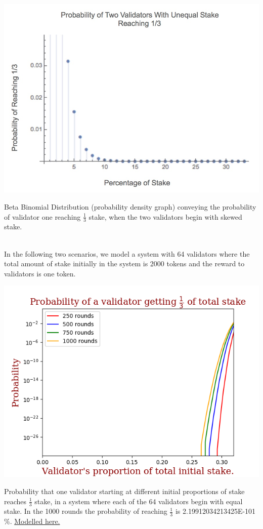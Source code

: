 \documentclass{article}
\renewcommand{\|}{\;|\;}
\begin{document}
\begin{center}
\includegraphics[scale=0.3]{images/2SkuVal.jpg}\newline\caption{Beta Binomial Distribution (probability density graph) conveying the probability of validator one reaching $\frac{1}{3}$ stake, when the two validators begin with skewed stake.}
\end{center} \\

In the following two scenarios, we model a system with 64 validators where the total amount of stake initially in the system is 2000 tokens and the reward to validators is one token. 

\begin{center}
\includegraphics[scale=0.60]{images/Cons_reward_probability.png}\newline\caption{Probability that one validator starting at different initial proportions of stake reaches $\frac{1}{3}$ stake, in a system where each of the 64 validators begin with equal stake. In the 1000 rounds the probability of reaching $\frac{1}{3}$ is 2.19912034213425E-101 \%. \href{https://github.com/aparnakr/pos-analysis}{Modelled here.}}
\end{center}
\end{document}
